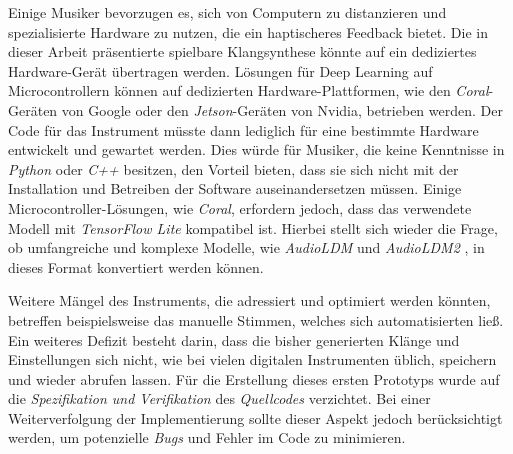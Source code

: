 \documentclass[
  a4paper,  %
  twoside,  %
  bibliography=totoc,
  headsepline,
  cleardoublepage=empty,
  parskip=half,
  draft=false
]{scrbook}
\begin{document}
Einige Musiker bevorzugen es, sich von Computern zu distanzieren und spezialisierte Hardware zu nutzen, die ein haptischeres Feedback bietet. Die in dieser Arbeit präsentierte spielbare Klangsynthese könnte auf ein dediziertes Hardware-Gerät übertragen werden. Lösungen für Deep Learning auf Microcontrollern \cite{saha_machine_2022} können auf dedizierten Hardware-Plattformen, wie den \emph{Coral}-Geräten \cite{noauthor_coral_nodate} von Google oder den \emph{Jetson}-Geräten \cite{noauthor_jetson_nodate} von Nvidia, betrieben werden. Der Code für das Instrument müsste dann lediglich für eine bestimmte Hardware entwickelt und gewartet werden. Dies würde für Musiker, die keine Kenntnisse in \emph{Python} oder \emph{C++} besitzen, den Vorteil bieten, dass sie sich nicht mit der Installation und Betreiben der Software auseinandersetzen müssen. Einige Microcontroller-Lösungen, wie \emph{Coral}, erfordern jedoch, dass das verwendete Modell mit \emph{TensorFlow Lite} \cite{noauthor_tensorflow_nodate} kompatibel ist. Hierbei stellt sich wieder die Frage, ob umfangreiche und komplexe Modelle, wie \emph{AudioLDM} \cite{liu_audioldm_2023} und \emph{AudioLDM2} \cite{liu_audioldm2_2023}, in dieses Format konvertiert werden können.

Weitere Mängel des Instruments, die adressiert und optimiert werden könnten, betreffen beispielsweise das manuelle Stimmen, welches sich automatisierten ließ. Ein weiteres Defizit besteht darin, dass die bisher generierten Klänge und Einstellungen sich nicht, wie bei vielen digitalen Instrumenten üblich, speichern und wieder abrufen lassen. Für die Erstellung dieses ersten Prototyps wurde auf die \emph{Spezifikation und Verifikation} des \emph{Quellcodes} verzichtet. Bei einer Weiterverfolgung der Implementierung sollte dieser Aspekt jedoch berücksichtigt werden, um potenzielle \emph{Bugs} und Fehler im Code zu minimieren.
\end{document}
